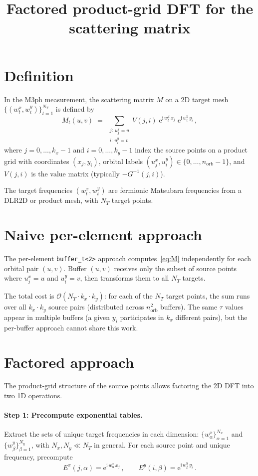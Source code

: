 \documentclass[11pt]{article}
\title{Factored product-grid DFT for the scattering matrix}
\author{}
\date{}
\newcommand{\ii}{\mathrm{i}}
\newcommand{\ee}{\mathrm{e}}
\newcommand{\orb}{n_{\mathrm{orb}}}
\begin{document}
\maketitle

\section{Definition}

In the M3ph measurement, the scattering matrix $M$ on a 2D target mesh $\{(w^x_t, w^y_t)\}_{t=1}^{N_T}$
is defined by
\begin{equation}\label{eq:M}
  M_t(u,v) \;=\; \sum_{\substack{j:\, u_j^x = u \\ i:\, u_i^y = v}}
    V(j,i)\; \ee^{\ii\, w^x_t\, x_j}\; \ee^{\ii\, w^y_t\, y_i} \,,
\end{equation}
where $j = 0,\dots,k_x{-}1$ and $i = 0,\dots,k_y{-}1$ index the source points
on a product grid with coordinates $(x_j, y_i)$,
orbital labels $(u_j^x, u_i^y) \in \{0,\dots,\orb{-}1\}$,
and $V(j,i)$ is the value matrix (typically $-G^{-1}(j,i)$).

The target frequencies $(w^x_t, w^y_t)$ are fermionic Matsubara frequencies
from a DLR2D or product mesh, with $N_T$ target points.


\section{Naive per-element approach}

The per-element \texttt{buffer\_t<2>} approach computes~\eqref{eq:M}
independently for each orbital pair $(u, v)$.
Buffer $(u, v)$ receives only the subset of source points where
$u_j^x = u$ and $u_i^y = v$, then transforms them to all $N_T$ targets.

The total cost is $\mathcal{O}(N_T \cdot k_x \cdot k_y)$:
for each of the $N_T$ target points, the sum runs over all $k_x \cdot k_y$
source pairs (distributed across $\orb^2$ buffers).
The same $\tau$ values appear in multiple buffers (a given $y_i$ participates
in $k_x$ different pairs), but the per-buffer approach cannot share this work.


\section{Factored approach}

The product-grid structure of the source points allows factoring the 2D
DFT into two 1D operations.

\paragraph{Step 1: Precompute exponential tables.}
Extract the sets of unique target frequencies in each dimension:
$\{w^x_\alpha\}_{\alpha=1}^{N_x}$ and $\{w^y_\beta\}_{\beta=1}^{N_y}$,
with $N_x, N_y \ll N_T$ in general.
For each source point and unique frequency, precompute
\begin{equation}
  E^x(j, \alpha) = \ee^{\ii\, w^x_\alpha\, x_j}\,,\qquad
  E^y(i, \beta)  = \ee^{\ii\, w^y_\beta\,  y_i}\,.
\end{equation}
\end{document}
